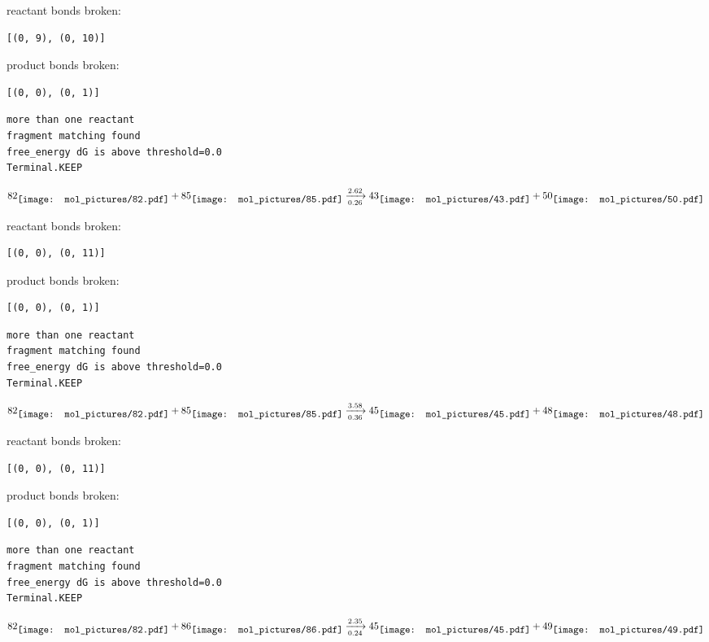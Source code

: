 \documentclass{article}
\begin{document}
reactant bonds broken:\begin{verbatim}
[(0, 9), (0, 10)]
\end{verbatim}
product bonds broken:\begin{verbatim}
[(0, 0), (0, 1)]
\end{verbatim}




\vspace{1cm}
\begin{verbatim}
more than one reactant
fragment matching found
free_energy dG is above threshold=0.0
Terminal.KEEP
\end{verbatim}
$$
82
\raisebox{-.5\height}{\texttt{[image: mol\_pictures/82.pdf]}}
+
85
\raisebox{-.5\height}{\texttt{[image: mol\_pictures/85.pdf]}}
\xrightarrow[0.26]{2.62}
43
\raisebox{-.5\height}{\texttt{[image: mol\_pictures/43.pdf]}}
+
50
\raisebox{-.5\height}{\texttt{[image: mol\_pictures/50.pdf]}}
$$


reactant bonds broken:\begin{verbatim}
[(0, 0), (0, 11)]
\end{verbatim}
product bonds broken:\begin{verbatim}
[(0, 0), (0, 1)]
\end{verbatim}




\vspace{1cm}
\begin{verbatim}
more than one reactant
fragment matching found
free_energy dG is above threshold=0.0
Terminal.KEEP
\end{verbatim}
$$
82
\raisebox{-.5\height}{\texttt{[image: mol\_pictures/82.pdf]}}
+
85
\raisebox{-.5\height}{\texttt{[image: mol\_pictures/85.pdf]}}
\xrightarrow[0.36]{3.58}
45
\raisebox{-.5\height}{\texttt{[image: mol\_pictures/45.pdf]}}
+
48
\raisebox{-.5\height}{\texttt{[image: mol\_pictures/48.pdf]}}
$$


reactant bonds broken:\begin{verbatim}
[(0, 0), (0, 11)]
\end{verbatim}
product bonds broken:\begin{verbatim}
[(0, 0), (0, 1)]
\end{verbatim}




\vspace{1cm}
\begin{verbatim}
more than one reactant
fragment matching found
free_energy dG is above threshold=0.0
Terminal.KEEP
\end{verbatim}
$$
82
\raisebox{-.5\height}{\texttt{[image: mol\_pictures/82.pdf]}}
+
86
\raisebox{-.5\height}{\texttt{[image: mol\_pictures/86.pdf]}}
\xrightarrow[0.24]{2.35}
45
\raisebox{-.5\height}{\texttt{[image: mol\_pictures/45.pdf]}}
+
49
\raisebox{-.5\height}{\texttt{[image: mol\_pictures/49.pdf]}}
$$
\end{document}
